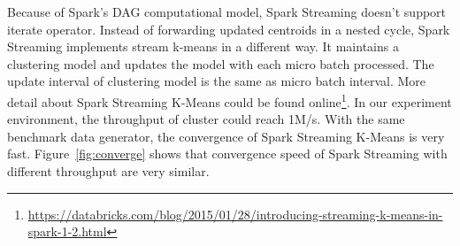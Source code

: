 Because of Spark's DAG computational model, Spark Streaming doesn't support iterate operator. Instead of forwarding updated centroids in a nested cycle, Spark Streaming implements stream k-means in a different way. It maintains a clustering model and updates the model with each micro batch processed. The update interval of clustering model is the same as micro batch interval. More detail about Spark Streaming K-Means could be found online\footnote{\url{https://databricks.com/blog/2015/01/28/introducing-streaming-k-means-in-spark-1-2.html}}. In our experiment environment, the throughput of cluster could reach 1M/s. With the same benchmark data generator, the convergence of Spark Streaming K-Means is very fast. Figure~\ref{fig:converge}  shows that convergence speed of Spark Streaming with different throughput are very similar. 
 
\clearpage



